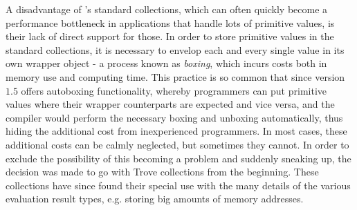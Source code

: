 A disadvantage of \java's standard collections, which can often quickly become a performance bottleneck in
applications that handle lots of primitive values, is their lack of direct support for those. In
order to store primitive values in the standard collections, it is necessary to envelop each and every single
value in its own wrapper object - a process known as \emph{boxing}, which incurs costs both in memory use and
computing time. This practice is so common that since version $1.5$ \java offers autoboxing functionality,
whereby programmers can put primitive values where their wrapper counterparts are expected and vice versa, and
the \java compiler would perform the necessary boxing and unboxing automatically, thus hiding the additional
cost from inexperienced programmers. In most cases, these additional costs can be calmly neglected, but
sometimes they cannot. In order to exclude the possibility of this becoming a problem and suddenly sneaking
up, the decision was made to go with Trove collections from the beginning. These collections have since found
their special use with the many details of the various evaluation result types, e.g. storing big amounts of
memory addresses.